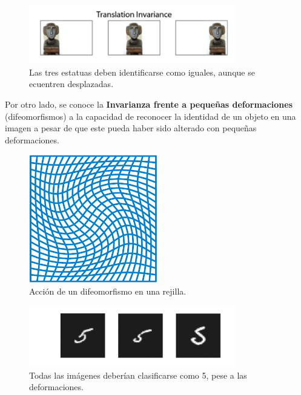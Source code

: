 \begin{figure} [!h]
    \centering
    \includegraphics[width=0.8\textwidth]{img/translation_invariance.png}
    \caption{Las tres estatuas deben identificarse como iguales, aunque se ecuentren desplazadas.}
    \label{fig:invarianza_traslaciones}
\end{figure}

\medskip

\noindent Por otro lado, se conoce la \textbf{Invarianza frente a pequeñas deformaciones} (difeomorfismos) a la capacidad de reconocer la identidad de un objeto en una imagen a pesar de que este pueda haber sido alterado con pequeñas deformaciones.


\begin{figure}[!h]
  \centering
  \includegraphics[width=0.5\textwidth]{img/Diffeomorphism.png}
  \caption{Acción de un difeomorfismo en una rejilla.}
  \label{fig:difeomorfismo}
\end{figure}

\begin{figure}[!h]
  \centering
  \includegraphics[width=0.8\textwidth]{img/5_deformado.png}
  \caption{Todas las imágenes deberían clasificarse como 5, pese a las deformaciones.}
  \label{fig:deformaciones_5}
\end{figure}


